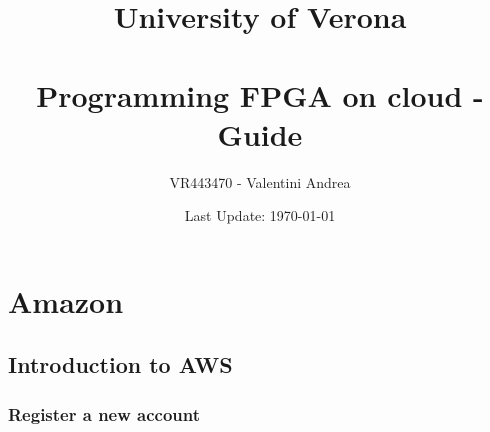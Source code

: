 \documentclass[a4paper]{article}
\begin{document}
    \author{VR443470 - Valentini Andrea}
    \title{University of Verona \\
    \:\\
    Programming FPGA on cloud - Guide}
    \date{Last Update: \today}

    \maketitle

    \newpage

    \tableofcontents

    \newpage

    \section{Amazon}

    \subsection{Introduction to AWS}
    
    \subsubsection{Register a new account}
\end{document}
